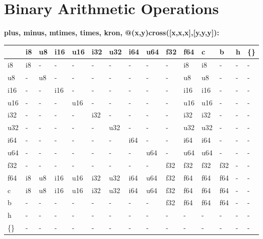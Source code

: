 \newpage
\section{Binary Arithmetic Operations}

\textbf{plus, minus, mtimes, times, kron, @(x,y)cross([x,x,x],[y,y,y]):}
\begin{scriptsize}\begin{tt}\begin{center}\vspace{-.3cm}\begin{tabular}{|m{.65cm}||m{.65cm}|m{.65cm}|m{.65cm}|m{.65cm}|m{.65cm}|m{.65cm}|m{.65cm}|m{.65cm}|m{.65cm}|m{.65cm}|m{.65cm}|m{.65cm}|m{.65cm}|m{.65cm}|}\hline 
&i8&u8&i16&u16&i32&u32&i64&u64&f32&f64&c&b&h&\{\}\\ \hline \hline
i8&i8&-&-&-&-&-&-&-&-&i8&i8&-&-&-\\ \hline
u8&-&u8&-&-&-&-&-&-&-&u8&u8&-&-&-\\ \hline
i16&-&-&i16&-&-&-&-&-&-&i16&i16&-&-&-\\ \hline
u16&-&-&-&u16&-&-&-&-&-&u16&u16&-&-&-\\ \hline
i32&-&-&-&-&i32&-&-&-&-&i32&i32&-&-&-\\ \hline
u32&-&-&-&-&-&u32&-&-&-&u32&u32&-&-&-\\ \hline
i64&-&-&-&-&-&-&i64&-&-&i64&i64&-&-&-\\ \hline
u64&-&-&-&-&-&-&-&u64&-&u64&u64&-&-&-\\ \hline
f32&-&-&-&-&-&-&-&-&f32&f32&f32&f32&-&-\\ \hline
f64&i8&u8&i16&u16&i32&u32&i64&u64&f32&f64&f64&f64&-&-\\ \hline
c&i8&u8&i16&u16&i32&u32&i64&u64&f32&f64&f64&f64&-&-\\ \hline
b&-&-&-&-&-&-&-&-&f32&f64&f64&f64&-&-\\ \hline
h&-&-&-&-&-&-&-&-&-&-&-&-&-&-\\ \hline
\{\}&-&-&-&-&-&-&-&-&-&-&-&-&-&-\\ \hline
\end{tabular}\end{center}\end{tt}\end{scriptsize} 


